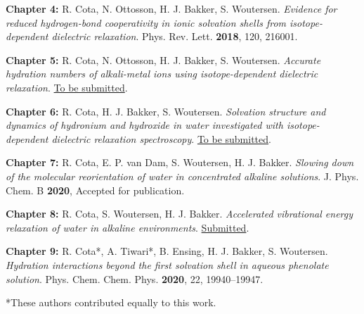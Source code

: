 

\noindent\textbf{Chapter 4:}
\noindent R. Cota, N. Ottosson, H. J. Bakker, S. Woutersen. \textit{Evidence for reduced hydrogen-bond cooperativity in ionic solvation shells from isotope-dependent dielectric relaxation}. Phys. Rev. Lett. \textbf{2018}, 120, 216001.

\medskip

\noindent\textbf{Chapter 5:}
\noindent R. Cota, N. Ottosson, H. J. Bakker, S. Woutersen. \textit{Accurate hydration numbers of alkali-metal ions using isotope-dependent dielectric relaxation}. \underline{To be submitted}.

\medskip

\noindent\textbf{Chapter 6:}
\noindent R. Cota, H. J. Bakker, S. Woutersen. \textit{Solvation structure and dynamics of hydronium and hydroxide in water investigated with isotope-dependent dielectric relaxation spectroscopy}. \underline{To be submitted}.

\medskip

\noindent\textbf{Chapter 7:}
\noindent R. Cota, E. P. van Dam, S. Woutersen, H. J. Bakker. \textit{Slowing down of the molecular reorientation of water in concentrated alkaline solutions}. J. Phys. Chem. B \textbf{2020}, Accepted for publication.

\medskip

\noindent\textbf{Chapter 8:}
\noindent R. Cota, S. Woutersen, H. J. Bakker. \textit{Accelerated vibrational energy relaxation of water in alkaline environments}. \underline{Submitted}.

\medskip

\noindent\textbf{Chapter 9:}
\noindent R. Cota*, A. Tiwari*, B. Ensing, H. J. Bakker, S. Woutersen. \textit{Hydration interactions beyond the first solvation shell in aqueous phenolate solution}. Phys. Chem. Chem. Phys. \textbf{2020}, 22, 19940--19947.


\medskip
*These authors contributed equally to this work.